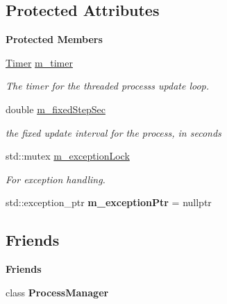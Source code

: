\subsection*{Protected Attributes}
\begin{Indent}\textbf{ Protected Members}\par
\begin{DoxyCompactItemize}
\item 
\mbox{\label{classrev_1_1_threaded_process_a842df6b91ffb0fed1678db9d6557c9e0}} 
\mbox{\hyperlink{classrev_1_1_timer}{Timer}} \mbox{\hyperlink{classrev_1_1_threaded_process_a842df6b91ffb0fed1678db9d6557c9e0}{m\+\_\+timer}}
\begin{DoxyCompactList}\small\item\em The timer for the threaded process\textquotesingle{}s update loop. \end{DoxyCompactList}\item 
\mbox{\label{classrev_1_1_threaded_process_a009eb6f3912ba743d77df197ae9b5ac2}} 
double \mbox{\hyperlink{classrev_1_1_threaded_process_a009eb6f3912ba743d77df197ae9b5ac2}{m\+\_\+fixed\+Step\+Sec}}
\begin{DoxyCompactList}\small\item\em the fixed update interval for the process, in seconds \end{DoxyCompactList}\item 
\mbox{\label{classrev_1_1_threaded_process_a13e749f587d9bb27084dd44c7b550a5c}} 
std\+::mutex \mbox{\hyperlink{classrev_1_1_threaded_process_a13e749f587d9bb27084dd44c7b550a5c}{m\+\_\+exception\+Lock}}
\begin{DoxyCompactList}\small\item\em For exception handling. \end{DoxyCompactList}\item 
\mbox{\label{classrev_1_1_threaded_process_a84419eeb57967e7ba129d0cf490c2895}} 
std\+::exception\+\_\+ptr {\bfseries m\+\_\+exception\+Ptr} = nullptr
\end{DoxyCompactItemize}
\end{Indent}
\subsection*{Friends}
\begin{Indent}\textbf{ Friends}\par
\begin{DoxyCompactItemize}
\item 
\mbox{\label{classrev_1_1_threaded_process_ae1701c7594fe2cf1c96b951a52eb0396}} 
class {\bfseries Process\+Manager}
\end{DoxyCompactItemize}
\end{Indent}
